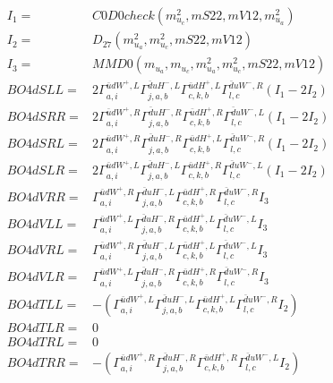 \documentclass[A4,landscape]{article}
\begin{document}
\begin{align} 
I_1 = & C0D0check(m^2_{u_{{c}}}, mS22, mV12, m^2_{u_{{a}}}) \\ 
I_2 = & D_{27}(m^2_{u_{{a}}}, m^2_{u_{{c}}}, mS22, mV12) \\ 
I_3 = & MMD0(m_{u_{{a}}}, m_{u_{{c}}}, m^2_{u_{{a}}}, m^2_{u_{{c}}}, mS22, mV12) \\ 
  BO4dSLL= & 2  \Gamma^{\bar{u}d W^+,L}_{a, i} \Gamma^{\bar{d}u H^- ,L}_{j, a, b} \Gamma^{\bar{u}d H^+,L}_{c, k, b} \Gamma^{\bar{d}u W^- ,R}_{l, c} (I_1 - 2 I_2) \\ 
  BO4dSRR= & 2  \Gamma^{\bar{u}d W^+,R}_{a, i} \Gamma^{\bar{d}u H^- ,R}_{j, a, b} \Gamma^{\bar{u}d H^+,R}_{c, k, b} \Gamma^{\bar{d}u W^- ,L}_{l, c} (I_1 - 2 I_2) \\ 
  BO4dSRL= & 2  \Gamma^{\bar{u}d W^+,R}_{a, i} \Gamma^{\bar{d}u H^- ,R}_{j, a, b} \Gamma^{\bar{u}d H^+,L}_{c, k, b} \Gamma^{\bar{d}u W^- ,R}_{l, c} (I_1 - 2 I_2) \\ 
  BO4dSLR= & 2  \Gamma^{\bar{u}d W^+,L}_{a, i} \Gamma^{\bar{d}u H^- ,L}_{j, a, b} \Gamma^{\bar{u}d H^+,R}_{c, k, b} \Gamma^{\bar{d}u W^- ,L}_{l, c} (I_1 - 2 I_2) \\ 
  BO4dVRR= &  \Gamma^{\bar{u}d W^+,R}_{a, i} \Gamma^{\bar{d}u H^- ,L}_{j, a, b} \Gamma^{\bar{u}d H^+,R}_{c, k, b} \Gamma^{\bar{d}u W^- ,R}_{l, c} I_3 \\ 
  BO4dVLL= &  \Gamma^{\bar{u}d W^+,L}_{a, i} \Gamma^{\bar{d}u H^- ,R}_{j, a, b} \Gamma^{\bar{u}d H^+,L}_{c, k, b} \Gamma^{\bar{d}u W^- ,L}_{l, c} I_3 \\ 
  BO4dVRL= &  \Gamma^{\bar{u}d W^+,R}_{a, i} \Gamma^{\bar{d}u H^- ,L}_{j, a, b} \Gamma^{\bar{u}d H^+,L}_{c, k, b} \Gamma^{\bar{d}u W^- ,L}_{l, c} I_3 \\ 
  BO4dVLR= &  \Gamma^{\bar{u}d W^+,L}_{a, i} \Gamma^{\bar{d}u H^- ,R}_{j, a, b} \Gamma^{\bar{u}d H^+,R}_{c, k, b} \Gamma^{\bar{d}u W^- ,R}_{l, c} I_3 \\ 
  BO4dTLL= & -( \Gamma^{\bar{u}d W^+,L}_{a, i} \Gamma^{\bar{d}u H^- ,L}_{j, a, b} \Gamma^{\bar{u}d H^+,L}_{c, k, b} \Gamma^{\bar{d}u W^- ,R}_{l, c} I_2) \\ 
  BO4dTLR= & 0 \\ 
  BO4dTRL= & 0 \\ 
  BO4dTRR= & -( \Gamma^{\bar{u}d W^+,R}_{a, i} \Gamma^{\bar{d}u H^- ,R}_{j, a, b} \Gamma^{\bar{u}d H^+,R}_{c, k, b} \Gamma^{\bar{d}u W^- ,L}_{l, c} I_2) \\ 
\end{align} 
\end{document}
